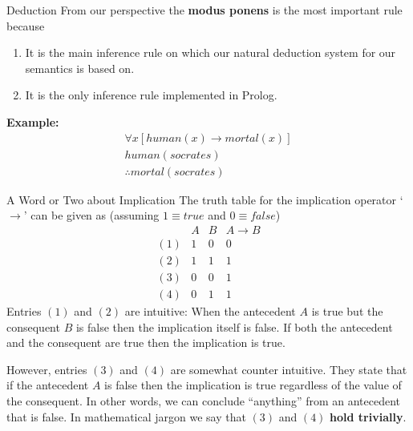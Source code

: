 \documentclass{beamer}
\begin{document}
\begin{frame}{Deduction}
From our perspective the {\bf modus ponens} is the most important rule because
\begin{enumerate}
\item
It is the main inference rule on which our natural deduction system for our semantics is based on.

\item
It is the only inference rule implemented in Prolog.

\end{enumerate}

\vspace{.1in}
{\bf Example:} 
\[
\begin{array}{l}
\forall x[\mathit{human}(x) \rightarrow \mathit{mortal}(x)]\\
\mathit{human}(\mathit{socrates})\\ \hline
\therefore\mathit{mortal}(\mathit{socrates})
\end{array}
\]

\end{frame}

\begin{frame}{A Word or Two about Implication}
The truth table for the implication operator `$\rightarrow$' can be given as (assuming $1\equiv \mathit{true}$ and $0\equiv\mathit{false}$)
{\scriptsize
\[
\begin{array}{lcc|c}
&A & B & A \rightarrow B\\ \hline
(1)& 1 & 0 & 0\\
(2) & 1 & 1 & 1\\
(3) & 0 & 0 & 1\\
(4) & 0 & 1 & 1
\end{array}
\]
}
Entries $(1)$ and $(2)$ are intuitive: When the antecedent $A$ is true but the consequent $B$ is false then
the implication itself is false.  If both the antecedent and the consequent are true then the implication is true.

\vspace{.1in}

However, entries $(3)$ and $(4)$ are somewhat counter intuitive.  They state that if the antecedent $A$ is false
then the implication is true regardless of the value of the consequent.  In other words, we can conclude ``anything''
from an antecedent that is false.  In mathematical jargon we say that $(3)$ and $(4)$  {\bf hold trivially}.
\end{frame}
\end{document}
